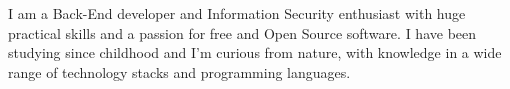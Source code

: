 \documentclass[9pt]{developercv} %
\begin{document}
\vspace{0.5cm}



\begin{minipage}[t]{0.4\textwidth} %
	\vspace{-\baselineskip} %
	
	I am a Back-End developer and Information Security enthusiast with huge practical skills and a passion for free and Open Source software. I have been studying since childhood and I'm curious from nature, with knowledge in a wide range of technology stacks and programming languages.\\ %
\end{minipage}
\hfill %
\begin{minipage}[t]{0.5\textwidth} %
	\vspace{-\baselineskip} %
	\begin{barchart}{5.5}
	\end{barchart}
\end{minipage}



\end{document}
